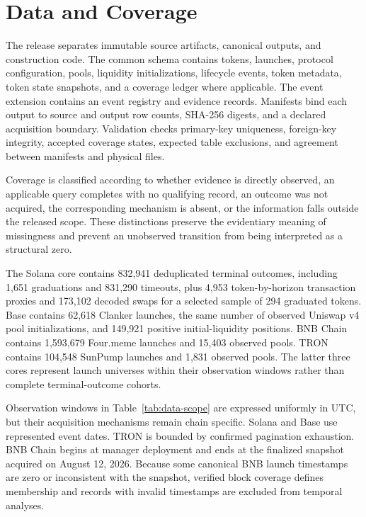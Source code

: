 \documentclass{article}
\begin{document}
\newpage
\appendix

\section{Data and Coverage}
\label{app:data}

The release separates immutable source artifacts, canonical outputs, and construction code. The common schema contains tokens, launches, protocol configuration, pools, liquidity initializations, lifecycle events, token metadata, token state snapshots, and a coverage ledger where applicable. The event extension contains an event registry and evidence records. Manifests bind each output to source and output row counts, SHA-256 digests, and a declared acquisition boundary. Validation checks primary-key uniqueness, foreign-key integrity, accepted coverage states, expected table exclusions, and agreement between manifests and physical files.

Coverage is classified according to whether evidence is directly observed, an applicable query completes with no qualifying record, an outcome was not acquired, the corresponding mechanism is absent, or the information falls outside the released scope. These distinctions preserve the evidentiary meaning of missingness and prevent an unobserved transition from being interpreted as a structural zero.

The Solana core contains 832,941 deduplicated terminal outcomes, including 1,651 graduations and 831,290 timeouts, plus 4,953 token-by-horizon transaction proxies and 173,102 decoded swaps for a selected sample of 294 graduated tokens. Base contains 62,618 Clanker launches, the same number of observed Uniswap v4 pool initializations, and 149,921 positive initial-liquidity positions. BNB Chain contains 1,593,679 Four.meme launches and 15,403 observed pools. TRON contains 104,548 SunPump launches and 1,831 observed pools. The latter three cores represent launch universes within their observation windows rather than complete terminal-outcome cohorts.

Observation windows in Table~\ref{tab:data-scope} are expressed uniformly in UTC, but their acquisition mechanisms remain chain specific. Solana and Base use represented event dates. TRON is bounded by confirmed pagination exhaustion. BNB Chain begins at manager deployment and ends at the finalized snapshot acquired on August 12, 2026. Because some canonical BNB launch timestamps are zero or inconsistent with the snapshot, verified block coverage defines membership and records with invalid timestamps are excluded from temporal analyses.
\end{document}
